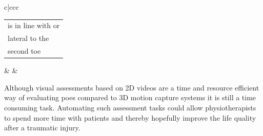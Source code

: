 \begin{table}
{\begin{tabu}[t]{c|ccc}
{\begin{tabular}[t]{@{}l@{}}
                                                is in line with or\\
                                                lateral to the\\
                                                second toe \end{tabular}} &
   &
\end{tabu}}

\end{table}




Although visual assessments based on 2D videos are a time and resource efficient way of evaluating \glspl{poe} compared to 3D motion capture systems it is still a time consuming task. Automating such assessment tasks could allow physiotherapists to spend more time with patients and thereby hopefully improve the life quality after a traumatic injury.



